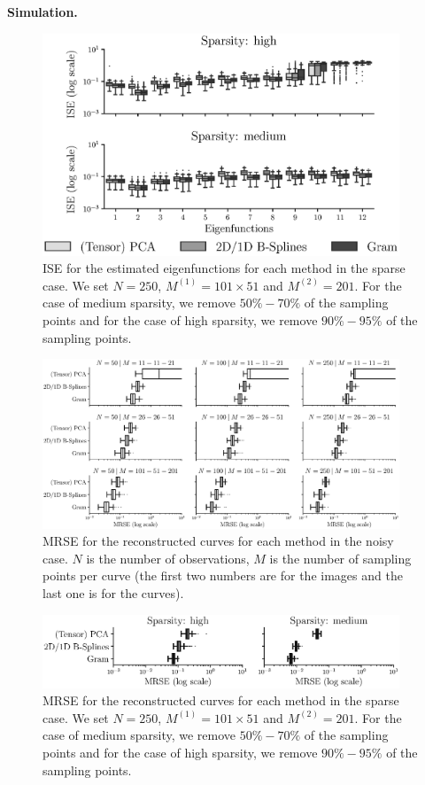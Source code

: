 \documentclass[times,sort&compress,3p]{elsarticle}
\theoremstyle{plain}%
\theoremstyle{definition}
\newenvironment{results}[1][]{\noindent \textbf{#1} \rmfamily}{\medskip}
\begin{document}
\begin{results}[Simulation.]
\begin{figure}
     \centering
    \includegraphics[width=0.95\textwidth]{ISE_sparse}
    \caption{ISE for the estimated eigenfunctions for each method in the sparse case. We set $N = 250$, $M^{(1)} = 101 \times 51$ and $M^{(2)} = 201$. For the case of medium sparsity, we remove $50\%-70\%$ of the sampling points and for the case of high sparsity, we remove $90\%-95\%$ of the sampling points.}
    \label{fig:ise_mfd_1d_sparse}
\end{figure}


\begin{figure}
     \centering
     \includegraphics[width=0.95\textwidth]{MRSE_noise}
    \caption{MRSE for the reconstructed curves for each method in the noisy case. $N$ is the number of observations, $M$ is the number of sampling points per curve (the first two numbers are for the images and the last one is for the curves).}
    \label{fig:mise_mfd_1d_noise}
\end{figure}

\begin{figure}
     \centering
     \includegraphics[width=0.95\textwidth]{MRSE_sparse}
    \caption{MRSE for the reconstructed curves for each method in the sparse case. We set $N = 250$, $M^{(1)} = 101 \times 51$ and $M^{(2)} = 201$. For the case of medium sparsity, we remove $50\%-70\%$ of the sampling points and for the case of high sparsity, we remove $90\%-95\%$ of the sampling points.}
    \label{fig:mise_mfd_1d_sparse}
\end{figure}
\end{results}
\end{document}
